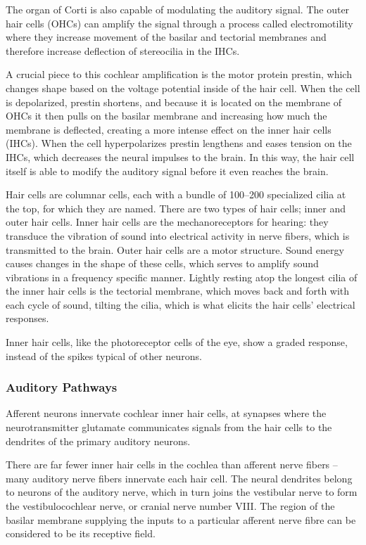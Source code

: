The organ of Corti is also capable of modulating the auditory signal.
The outer hair cells (OHCs) can amplify the signal through a process
called electromotility where they increase movement of the basilar and
tectorial membranes and therefore increase deflection of stereocilia in
the IHCs.

A crucial piece to this cochlear amplification is the motor protein
prestin, which changes shape based on the voltage potential inside of
the hair cell. When the cell is depolarized, prestin shortens, and
because it is located on the membrane of OHCs it then pulls on the
basilar membrane and increasing how much the membrane is deflected,
creating a more intense effect on the inner hair cells (IHCs). When the
cell hyperpolarizes prestin lengthens and eases tension on the IHCs,
which decreases the neural impulses to the brain. In this way, the hair
cell itself is able to modify the auditory signal before it even reaches
the brain.

Hair cells are columnar cells, each with a bundle of 100--200
specialized cilia at the top, for which they are named. There are two
types of hair cells; inner and outer hair cells. Inner hair cells are
the mechanoreceptors for hearing: they transduce the vibration of sound
into electrical activity in nerve fibers, which is transmitted to the
brain. Outer hair cells are a motor structure. Sound energy causes
changes in the shape of these cells, which serves to amplify sound
vibrations in a frequency specific manner. Lightly resting atop the
longest cilia of the inner hair cells is the tectorial membrane, which
moves back and forth with each cycle of sound, tilting the cilia, which
is what elicits the hair cells' electrical responses.

Inner hair cells, like the photoreceptor cells of the eye, show a graded
response, instead of the spikes typical of other neurons.

\hypertarget{auditory-pathways}{%
\subsubsection{Auditory Pathways}\label{auditory-pathways}}

Afferent neurons innervate cochlear inner hair cells, at synapses where
the neurotransmitter glutamate communicates signals from the hair cells
to the dendrites of the primary auditory neurons.

There are far fewer inner hair cells in the cochlea than afferent nerve
fibers -- many auditory nerve fibers innervate each hair cell. The
neural dendrites belong to neurons of the auditory nerve, which in turn
joins the vestibular nerve to form the vestibulocochlear nerve, or
cranial nerve number VIII. The region of the basilar membrane supplying
the inputs to a particular afferent nerve fibre can be considered to be
its receptive field.

